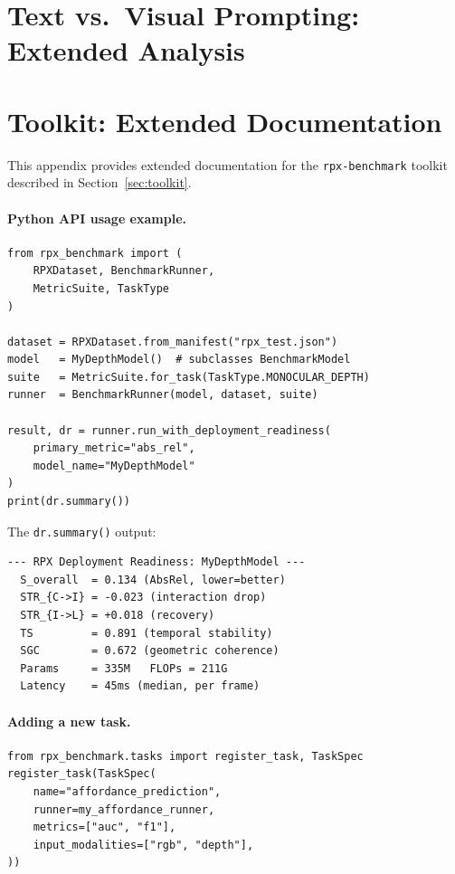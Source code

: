 \section{Text vs.\ Visual Prompting: Extended Analysis}
\label{sec:appendix-prompting}



\section{\coolname{} Toolkit: Extended Documentation}
\label{sec:appendix-toolkit}

This appendix provides extended documentation for the \texttt{rpx-benchmark} toolkit described in Section~\ref{sec:toolkit}.

\paragraph{Python API usage example.}
\begin{verbatim}
from rpx_benchmark import (
    RPXDataset, BenchmarkRunner,
    MetricSuite, TaskType
)

dataset = RPXDataset.from_manifest("rpx_test.json")
model   = MyDepthModel()  # subclasses BenchmarkModel
suite   = MetricSuite.for_task(TaskType.MONOCULAR_DEPTH)
runner  = BenchmarkRunner(model, dataset, suite)

result, dr = runner.run_with_deployment_readiness(
    primary_metric="abs_rel",
    model_name="MyDepthModel"
)
print(dr.summary())
\end{verbatim}

The \texttt{dr.summary()} output:
\begin{verbatim}
--- RPX Deployment Readiness: MyDepthModel ---
  S_overall  = 0.134 (AbsRel, lower=better)
  STR_{C->I} = -0.023 (interaction drop)
  STR_{I->L} = +0.018 (recovery)
  TS         = 0.891 (temporal stability)
  SGC        = 0.672 (geometric coherence)
  Params     = 335M   FLOPs = 211G
  Latency    = 45ms (median, per frame)
\end{verbatim}

\paragraph{Adding a new task.}
\begin{verbatim}
from rpx_benchmark.tasks import register_task, TaskSpec
register_task(TaskSpec(
    name="affordance_prediction",
    runner=my_affordance_runner,
    metrics=["auc", "f1"],
    input_modalities=["rgb", "depth"],
))
\end{verbatim}

